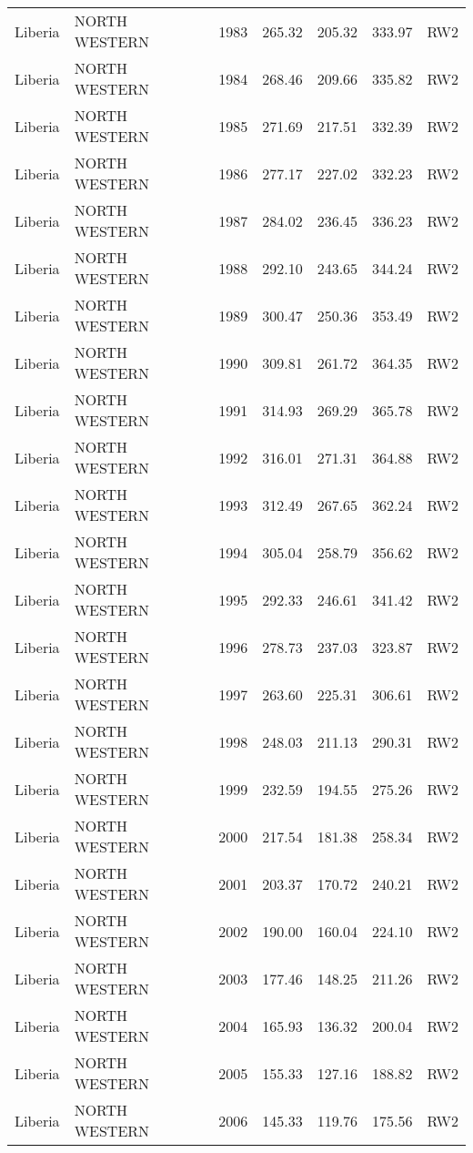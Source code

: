 \begin{longtable}{lllrrrl}
  Liberia & NORTH WESTERN & 1983 & 265.32 & 205.32 & 333.97 & RW2 \\ 
  Liberia & NORTH WESTERN & 1984 & 268.46 & 209.66 & 335.82 & RW2 \\ 
  Liberia & NORTH WESTERN & 1985 & 271.69 & 217.51 & 332.39 & RW2 \\ 
  Liberia & NORTH WESTERN & 1986 & 277.17 & 227.02 & 332.23 & RW2 \\ 
  Liberia & NORTH WESTERN & 1987 & 284.02 & 236.45 & 336.23 & RW2 \\ 
  Liberia & NORTH WESTERN & 1988 & 292.10 & 243.65 & 344.24 & RW2 \\ 
  Liberia & NORTH WESTERN & 1989 & 300.47 & 250.36 & 353.49 & RW2 \\ 
  Liberia & NORTH WESTERN & 1990 & 309.81 & 261.72 & 364.35 & RW2 \\ 
  Liberia & NORTH WESTERN & 1991 & 314.93 & 269.29 & 365.78 & RW2 \\ 
  Liberia & NORTH WESTERN & 1992 & 316.01 & 271.31 & 364.88 & RW2 \\ 
  Liberia & NORTH WESTERN & 1993 & 312.49 & 267.65 & 362.24 & RW2 \\ 
  Liberia & NORTH WESTERN & 1994 & 305.04 & 258.79 & 356.62 & RW2 \\ 
  Liberia & NORTH WESTERN & 1995 & 292.33 & 246.61 & 341.42 & RW2 \\ 
  Liberia & NORTH WESTERN & 1996 & 278.73 & 237.03 & 323.87 & RW2 \\ 
  Liberia & NORTH WESTERN & 1997 & 263.60 & 225.31 & 306.61 & RW2 \\ 
  Liberia & NORTH WESTERN & 1998 & 248.03 & 211.13 & 290.31 & RW2 \\ 
  Liberia & NORTH WESTERN & 1999 & 232.59 & 194.55 & 275.26 & RW2 \\ 
  Liberia & NORTH WESTERN & 2000 & 217.54 & 181.38 & 258.34 & RW2 \\ 
  Liberia & NORTH WESTERN & 2001 & 203.37 & 170.72 & 240.21 & RW2 \\ 
  Liberia & NORTH WESTERN & 2002 & 190.00 & 160.04 & 224.10 & RW2 \\ 
  Liberia & NORTH WESTERN & 2003 & 177.46 & 148.25 & 211.26 & RW2 \\ 
  Liberia & NORTH WESTERN & 2004 & 165.93 & 136.32 & 200.04 & RW2 \\ 
  Liberia & NORTH WESTERN & 2005 & 155.33 & 127.16 & 188.82 & RW2 \\ 
  Liberia & NORTH WESTERN & 2006 & 145.33 & 119.76 & 175.56 & RW2 \\ 

\end{longtable}
